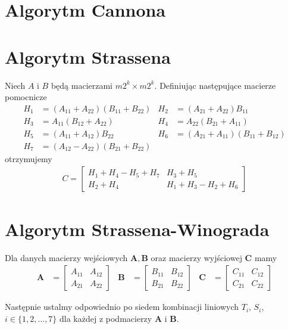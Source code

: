 \documentclass[a4paper,oneside,leqno,12pt]{book}
\theoremstyle{definition}
\theoremstyle{plain}
\theoremstyle{remark}
\begin{document}
\section{Algorytm Cannona}
\cite{Cannon:1969:CCI:905686}
\section{Algorytm Strassena}
Niech \(A\) i \(B\) będą macierzami \(m2^k\times m2^k\). Definiując następujące macierze pomocnicze
\begin{align*}
H_1 &= (A_{11}+A_{22})(B_{11}+B_{22})&
 H_2 &= (A_{21}+A_{22})B_{11}\\
H_3 &= A_{11}(B_{12} + A_{22})&
 H_4 &= A_{22}(B_{21} + A_{11})\\
H_5 &= (A_{11}+A_{12})B_{22}&
 H_6 &= (A_{21} + A_{11})(B_{11} + B_{12}) \\
H_7 &= (A_{12}-A_{22})(B_{21}+B_{22}) 
\end{align*}
otrzymujemy
\begin{align}
C = \begin{bmatrix}
H_1+H_4-H_5+H_7& H_3+H_5\\
H_2+H_4& H_1+H_3-H_2+H_6
\end{bmatrix}
\end{align}

\section{Algorytm Strassena-Winograda}
Dla danych macierzy wejściowych \(\mathbf{A}, \mathbf{B}\) oraz macierzy wyjściowej \(\mathbf{C}\) mamy
\begin{align*}
\mathbf{A}& = \begin{bmatrix} A_{11}& A_{12} \\ A_{21}& A_{22} \end{bmatrix}&
\mathbf{B}& = \begin{bmatrix} B_{11}& B_{12} \\ B_{21}& B_{22} \end{bmatrix}&
\mathbf{C}& = \begin{bmatrix} C_{11}& C_{12} \\ C_{21}& C_{22} \end{bmatrix}
\end{align*}

Następnie ustalmy odpowiednio po siedem kombinacji liniowych \(T_i\), \(S_i\), \(i\in \{1, 2, \dots,7\}\) dla każdej z podmacierzy \(\mathbf{A}\) i \(\mathbf{B}\).
\end{document}

